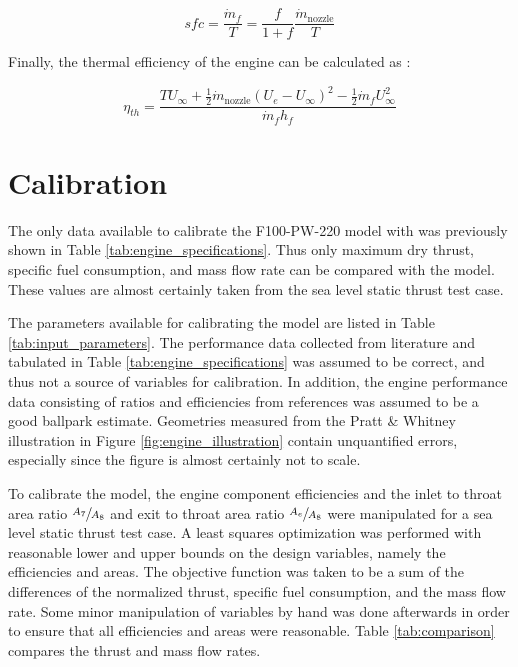 \documentclass{article}
\begin{document}
\begin{equation}
\label{eq:sfc}
sfc = \frac{\dot{m}_f}{T} = \frac{f}{1 + f} \frac{\dot{m}_{\textrm{nozzle}}}{T}
\end{equation}

Finally, the thermal efficiency of the engine can be calculated as \cite{cantwell283}:

\begin{equation}
\label{eq:thermalEfficiency}
\eta_{th} = \frac{T U_{\infty} + \frac{1}{2} \dot{m}_{\textrm{nozzle}} \left( U_e - U_{\infty} \right) ^2 - \frac{1}{2} \dot{m}_f U_{\infty}^2}{\dot{m}_f h_f}
\end{equation}

\section{Calibration}

The only data available to calibrate the F100-PW-220 model with was previously shown in Table \ref{tab:engine_specifications}. Thus only maximum dry thrust, specific fuel consumption, and mass flow rate can be compared with the model. These values are almost certainly taken from the sea level static thrust test case. 

The parameters available for calibrating the model are listed in Table \ref{tab:input_parameters}. The performance data collected from literature and tabulated in Table \ref{tab:engine_specifications} was assumed to be correct, and thus not a source of variables for calibration. In addition, the engine performance data consisting of ratios and efficiencies from references \cite{cantwell283,Lee2009} was assumed to be a good ballpark estimate. Geometries measured from the Pratt \& Whitney illustration in Figure \ref{fig:engine_illustration} contain unquantified errors, especially since the figure is almost certainly not to scale. 

To calibrate the model, the engine component efficiencies and the inlet to throat area ratio $\sfrac{A_7}{A_8}$ and exit to throat area ratio $\sfrac{A_e}{A_8}$ were manipulated for a sea level static thrust test case. A least squares optimization was performed with reasonable lower and upper bounds on the design variables, namely the efficiencies and areas. The objective function was taken to be a sum of the differences of the normalized thrust, specific fuel consumption, and the mass flow rate. Some minor manipulation of variables by hand was done afterwards in order to ensure that all efficiencies and areas were reasonable. Table \ref{tab:comparison} compares the thrust and mass flow rates.
\end{document}
